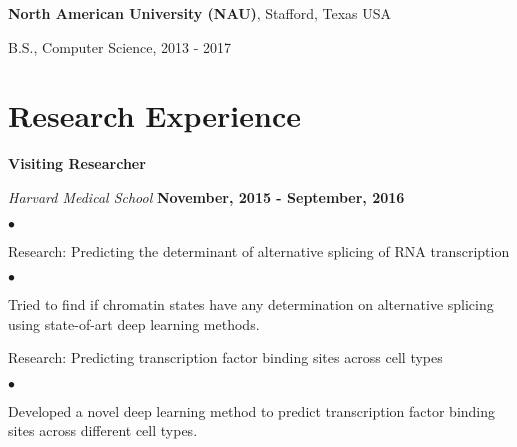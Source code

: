 \documentclass[margin,line]{res}
\newenvironment{list1}{
  \begin{list}{\ding{113}}{%
      \setlength{\itemsep}{0in}
      \setlength{\parsep}{0in} \setlength{\parskip}{0in}
      \setlength{\topsep}{0in} \setlength{\partopsep}{0in} 
      \setlength{\leftmargin}{0.17in}}}{\end{list}}
\newenvironment{list2}{
  \begin{list}{$\bullet$}{%
      \setlength{\itemsep}{0in}
      \setlength{\parsep}{0in} \setlength{\parskip}{0in}
      \setlength{\topsep}{0in} \setlength{\partopsep}{0in} 
      \setlength{\leftmargin}{0.2in}}}{\end{list}}
\begin{document}
\begin{resume}
{\bf North American University (NAU)}, Stafford, Texas USA\\
\vspace*{-.1in}
\begin{list1}
\item[] B.S., Computer Science,  2013 - 2017
\end{list1}


\section{\sc Research Experience}




{\bf Visiting Researcher}

\vspace{-.3cm}
{\em Harvard Medical School} \hfill {\bf November, 2015 - September, 2016}\\
\vspace{-.3cm}
\begin{list2}
\item Research: Predicting the determinant of alternative splicing of RNA transcription
\begin{list2}
\item Tried to find if chromatin states have any determination on alternative splicing using state-of-art deep learning methods.
\end{list2}
\item Research: Predicting transcription factor binding sites across cell types
\begin{list2}
\item Developed a novel deep learning method to predict transcription factor binding sites across different cell types. 
\end{list2}
\end{list2}


\end{resume}
\end{document}
